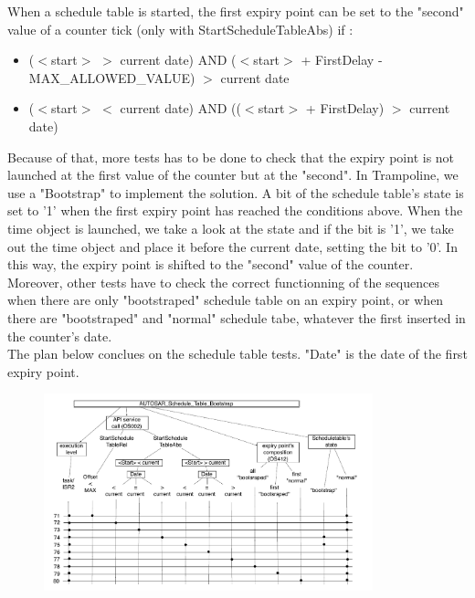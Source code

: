 \documentclass[10pt]{article}
\begin{document}
	When a schedule table is started, the first expiry point can be set to the "second" value of a counter tick (only with StartScheduleTableAbs) if :
	\begin{itemize}
		\item ($<$start$>$ $>$ current date) AND ($<$start$>$ + FirstDelay - MAX\_ALLOWED\_VALUE) $>$ current date
		\item ($<$start$>$ $<$ current date) AND (($<$start$>$ + FirstDelay) $>$ current date)
	\end{itemize}
	Because of that, more tests has to be done to check that the expiry point is not launched at the first value of the counter but at the "second". In Trampoline, we use a "Bootstrap" to implement the solution. A bit of the schedule table's state is set to '1' when the first expiry point has reached the conditions above. When the time object is launched, we take a look at the state and if the bit is '1', we take out the time object and place it before the current date, setting the bit to '0'. In this way, the expiry point is shifted to the "second" value of the counter. \\
	Moreover, other tests have to check the correct functionning of the sequences when there are only "bootstraped" schedule table on an expiry point, or when there are "bootstraped" and "normal" schedule tabe, whatever the first inserted in the counter's date. \\ 
	The plan below conclues on the schedule table tests. "Date" is the date of the first expiry point. \\

	\begin{figure}[htbp] %
  		\centering
		\includegraphics[width=0.85\textwidth]{graphics/AUTOSAR_Schedule_Table_Bootstrap.pdf}
	\end{figure}
	
\end{document}
